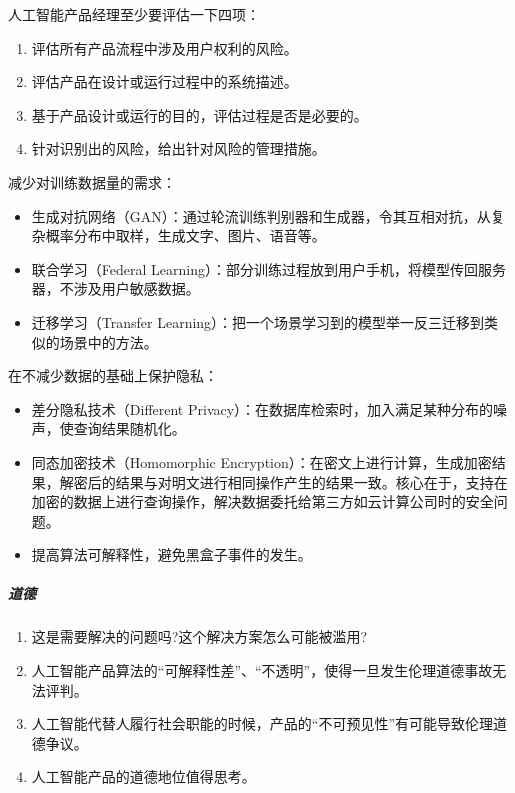 \documentclass[letterpaper,10pt,english]{sphinxmanual}
\begin{document}
人工智能产品经理至少要评估一下四项：
\begin{enumerate}
%
\item {} 
评估所有产品流程中涉及用户权利的风险。

\item {} 
评估产品在设计或运行过程中的系统描述。

\item {} 
基于产品设计或运行的目的，评估过程是否是必要的。

\item {} 
针对识别出的风险，给出针对风险的管理措施。

\end{enumerate}

减少对训练数据量的需求：
\begin{itemize}
\item {} 
生成对抗网络（GAN）：通过轮流训练判别器和生成器，令其互相对抗，从复杂概率分布中取样，生成文字、图片、语音等。

\item {} 
联合学习（Federal
Learning）：部分训练过程放到用户手机，将模型传回服务器，不涉及用户敏感数据。

\item {} 
迁移学习（Transfer
Learning）：把一个场景学习到的模型举一反三迁移到类似的场景中的方法。

\end{itemize}

在不减少数据的基础上保护隐私：
\begin{itemize}
\item {} 
差分隐私技术（Different
Privacy）：在数据库检索时，加入满足某种分布的噪声，使查询结果随机化。

\item {} 
同态加密技术（Homomorphic
Encryption）：在密文上进行计算，生成加密结果，解密后的结果与对明文进行相同操作产生的结果一致。核心在于，支持在加密的数据上进行查询操作，解决数据委托给第三方如云计算公司时的安全问题。

\item {} 
提高算法可解释性，避免黑盒子事件的发生。

\end{itemize}


\subparagraph{道德}
\label{\detokenize{chapter_introduction/AI_PM:id39}}\begin{enumerate}
%
\item {} 
这是需要解决的问题吗?这个解决方案怎么可能被滥用?

\item {} 
人工智能产品算法的“可解释性差”、“不透明”，使得一旦发生伦理道德事故无法评判。

\item {} 
人工智能代替人履行社会职能的时候，产品的“不可预见性”有可能导致伦理道德争议。

\item {} 
人工智能产品的道德地位值得思考。

\end{enumerate}
\end{document}
